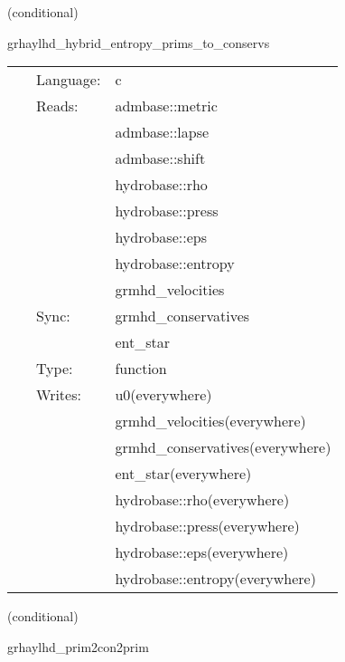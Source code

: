    (conditional) 

\hspace{5mm} grhaylhd\_hybrid\_entropy\_prims\_to\_conservs 

\hspace{5mm}{\it entropy+hybrid version of grhaylhd\_prims\_to\_conservs } 


\hspace{5mm}

 \begin{tabular*}{160mm}{cll} 
~ & Language:  & c \\ 
~ & Reads:  & admbase::metric \\ 
~& ~ &admbase::lapse\\ 
~& ~ &admbase::shift\\ 
~& ~ &hydrobase::rho\\ 
~& ~ &hydrobase::press\\ 
~& ~ &hydrobase::eps\\ 
~& ~ &hydrobase::entropy\\ 
~& ~ &grmhd\_velocities\\ 
~ & Sync:  & grmhd\_conservatives \\ 
~& ~ &ent\_star\\ 
~ & Type:  & function \\ 
~ & Writes:  & u0(everywhere) \\ 
~& ~ &grmhd\_velocities(everywhere)\\ 
~& ~ &grmhd\_conservatives(everywhere)\\ 
~& ~ &ent\_star(everywhere)\\ 
~& ~ &hydrobase::rho(everywhere)\\ 
~& ~ &hydrobase::press(everywhere)\\ 
~& ~ &hydrobase::eps(everywhere)\\ 
~& ~ &hydrobase::entropy(everywhere)\\ 
\end{tabular*} 


\vspace{5mm}

   (conditional) 

\hspace{5mm} grhaylhd\_prim2con2prim 

\hspace{5mm}{\it convert hydrobase initial data to grhaylhd variables } 


\hspace{5mm}

